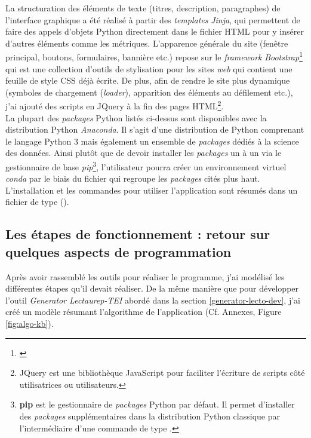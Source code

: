 La structuration des éléments de texte (titres, description, paragraphes) de l'interface graphique a été réalisé à partir des \textit{templates} \textit{Jinja}, qui permettent de faire des appels d'objets Python directement dans le fichier HTML pour y insérer d'autres éléments comme les métriques. L'apparence générale du site (fenêtre principal, boutons, formulaires, bannière etc.) repose sur le \textit{framework} \textit{Bootstrap}\footnote{\cite{otto_bootstrap_nodate}} qui est une collection d'outils de stylisation pour les sites \textit{web} qui contient une feuille de style CSS déjà écrite. De plus, afin de rendre le site plus dynamique (symboles de chargement (\textit{loader}), apparition des éléments au défilement etc.), j'ai ajouté des scripts en JQuery à la fin des pages HTML\footnote{JQuery est une bibliothèque JavaScript pour faciliter l'écriture de scripts côté utilisatrices ou utilisateurs.}.\\

La plupart des \textit{packages} Python listés ci-dessus sont disponibles avec la distribution Python \textit{Anaconda}. Il s'agit d'une distribution de Python comprenant le langage Python 3 mais également un ensemble de \textit{packages} dédiés à la science des données. Ainsi plutôt que de devoir installer les \textit{packages} un à un via le gestionnaire de base \textit{pip}\footnote{\textbf{pip} est le gestionnaire de \textit{packages} Python par défaut. Il permet d'installer des \textit{packages} supplémentaires dans la distribution Python classique par l'intermédiaire d'une commande de type .}, l'utilisateur pourra créer un environnement virtuel \textit{conda} par le biais du fichier  qui regroupe les \textit{packages} cités plus haut.\\ 

L'installation et les commandes pour utiliser l'application sont résumés dans un fichier de type  ().
\newpage
\subsection{Les étapes de fonctionnement : retour sur quelques aspects de programmation}

Après avoir rassemblé les outils pour réaliser le programme, j'ai modélisé les différentes étapes qu'il devait réaliser. De la même manière que pour développer l'outil \textit{Generator Lectaurep-TEI} abordé dans la section \ref{generator-lecto-dev}, j'ai créé un modèle résumant l'algorithme de l'application (Cf. Annexes, Figure \ref{fig:algo-kb}).\\

